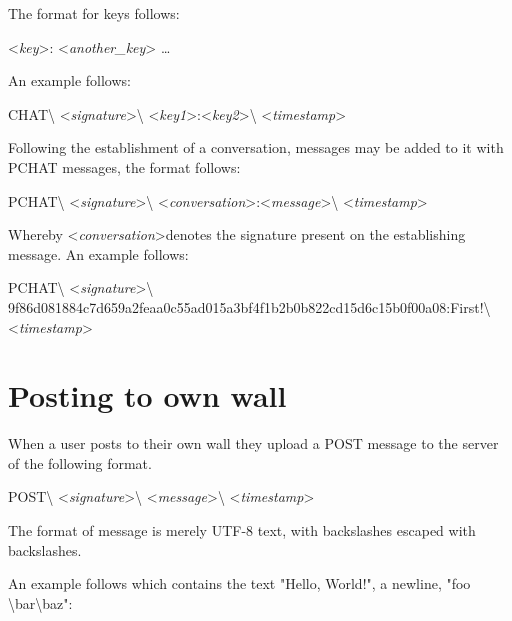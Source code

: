 The format for keys follows:

\begin{center}
\textless \textit{key}\textgreater:
\textless \textit{another\_key}\textgreater
\ldots
\end{center}

An example follows:

\begin{center}
CHAT\textbackslash
\textless \textit{signature}\textgreater\textbackslash
\textless \textit{key1}\textgreater:\textless \textit{key2}\textgreater\textbackslash
\textless \textit{timestamp}\textgreater
\end{center}

Following the establishment of a conversation, messages may be added to it with
PCHAT messages, the format follows:

\begin{center}
PCHAT\textbackslash
\textless \textit{signature}\textgreater\textbackslash
\textless \textit{conversation}\textgreater:\textless \textit{message}\textgreater\textbackslash
\textless \textit{timestamp}\textgreater
\end{center}

Whereby \textless \textit{conversation}\textgreater denotes the signature
present on the establishing message. An example follows:

\begin{center}
PCHAT\textbackslash
\textless \textit{signature}\textgreater\textbackslash
9f86d081884c7d659a2feaa0c55ad015a3bf4f1b2b0b822cd15d6c15b0f00a08:First!\textbackslash
\textless \textit{timestamp}\textgreater
\end{center}

\section{Posting to own wall}
When a user posts to their own wall they upload a POST message to the server of
the following format.

\begin{center}
POST\textbackslash
\textless \textit{signature}\textgreater\textbackslash
\textless \textit{message}\textgreater\textbackslash
\textless \textit{timestamp}\textgreater
\end{center}

The format of message is merely UTF-8 text, with backslashes escaped with
backslashes.

An example follows which contains the text "Hello, World!", a newline, "foo
\textbackslash bar\textbackslash baz":

